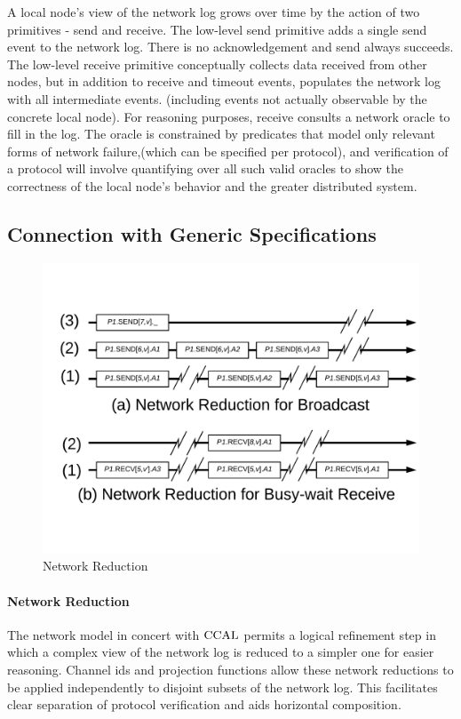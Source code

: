 A local node's view of the network log grows over time by the action of two
primitives - send and receive. The low-level send primitive adds a single send
event to the network log. There is no acknowledgement and send always succeeds.
The low-level receive primitive conceptually collects data received from other
nodes, but in addition to receive and timeout events, populates the network log
with all intermediate events. (including events not actually observable by the
concrete local node). For reasoning purposes, receive consults a network oracle
to fill in the log. The oracle is constrained by predicates that model only
relevant forms of network failure,(which can be specified per protocol), and
verification of a protocol will involve quantifying over all such valid oracles
to show the correctness of the local node's behavior and the greater distributed
system.

\subsection{Connection with Generic Specifications}
\label{chapter:witnesspassing:subsec:connection}

\begin{figure}
\begin{center}
\includegraphics[scale=0.3]{figs/witnesspassing/network_reduction.pdf}
\end{center}
\caption{Network Reduction}
\label{fig:chapter:witnesspassing:network-reduction}
\end{figure}

\paragraph{Network Reduction}
The network model in concert with $\mathrm{CCAL}$ permits a logical refinement step in
which a complex view of the network log is reduced to a simpler one for easier
reasoning. Channel ids and projection functions allow these network
reductions to be applied independently to disjoint subsets of the network log.
This facilitates clear separation of protocol verification and aids
horizontal composition.

